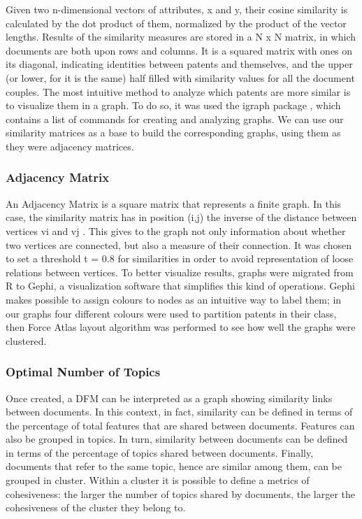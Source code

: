 \documentclass[]{book}
\begin{document}
Given two n-dimensional vectors of attributes, x and y, their cosine
similarity is calculated by the dot product of them, normalized by the
product of the vector lengths. Results of the similarity measures are
stored in a N x N matrix, in which documents are both upon rows and
columns. It is a squared matrix with ones on its diagonal, indicating
identities between patents and themselves, and the upper (or lower, for
it is the same) half filled with similarity values for all the document
couples. The most intuitive method to analyze which patents are more
similar is to visualize them in a graph. To do so, it was used the
igraph package , which contains a list of commands for creating and
analyzing graphs. We can use our similarity matrices as a base to build
the corresponding graphs, using them as they were adjacency matrices.

\subsubsection*{Adjacency Matrix}\label{adjacency-matrix}

An Adjacency Matrix is a square matrix that represents a finite graph.
In this case, the similarity matrix has in position (i,j) the inverse of
the distance between vertices vi and vj . This gives to the graph not
only information about whether two vertices are connected, but also a
measure of their connection. It was chosen to set a threshold t = 0.8
for similarities in order to avoid representation of loose relations
between vertices. To better visualize results, graphs were migrated from
R to Gephi, a visualization software that simplifies this kind of
operations. Gephi makes possible to assign colours to nodes as an
intuitive way to label them; in our graphs four different colours were
used to partition patents in their class, then Force Atlas layout
algorithm was performed to see how well the graphs were clustered.

\subsubsection*{Optimal Number of
Topics}\label{optimal-number-of-topics}

Once created, a DFM can be interpreted as a graph showing similarity
links between documents. In this context, in fact, similarity can be
defined in terms of the percentage of total features that are shared
between documents. Features can also be grouped in topics. In turn,
similarity between documents can be defined in terms of the percentage
of topics shared between documents. Finally, documents that refer to the
same topic, hence are similar among them, can be grouped in cluster.
Within a cluster it is possible to define a metrics of cohesiveness: the
larger the number of topics shared by documents, the larger the
cohesiveness of the cluster they belong to.
\end{document}
